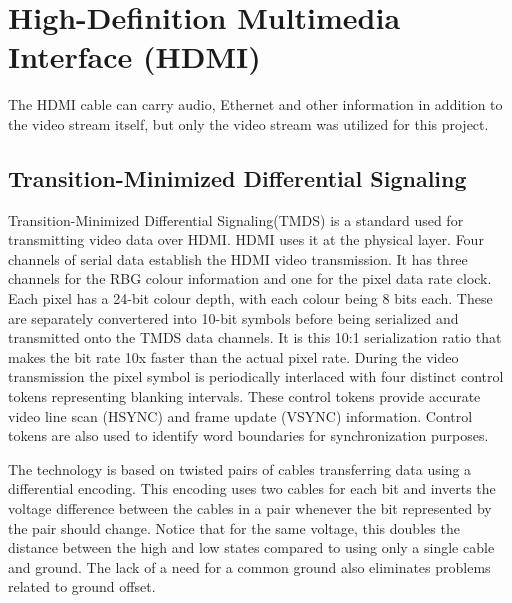 \section{High-Definition Multimedia Interface (HDMI)}
The HDMI cable can carry audio, Ethernet and other information in addition to the video stream itself, but only the video stream was utilized for this project.

\subsection{Transition-Minimized Differential Signaling}
Transition-Minimized Differential Signaling(TMDS) is a standard used for transmitting video data over HDMI.
HDMI uses it at the physical layer.
Four channels of serial data establish the HDMI video transmission.
It has three channels for the RBG colour information and one for the pixel data rate clock.
Each pixel has a 24-bit colour depth, with each colour being 8 bits each.
These are separately convertered into 10-bit symbols before being serialized and transmitted onto the TMDS data channels.
It is this 10:1 serialization ratio that makes the bit rate 10x faster than the actual pixel rate.
During the video transmission the pixel symbol is periodically interlaced with four distinct control tokens representing blanking intervals.
These control tokens provide accurate video line scan (HSYNC) and frame update (VSYNC) information.
Control tokens are also used to identify word boundaries for synchronization purposes.

The technology is based on twisted pairs of cables transferring data using a differential encoding.
This encoding uses two cables for each bit and inverts the voltage difference between the cables in a pair whenever the bit represented by the pair should change.
Notice that for the same voltage, this doubles the distance between the high and low states compared to using only a single cable and ground.
The lack of a need for a common ground also eliminates problems related to ground offset.


